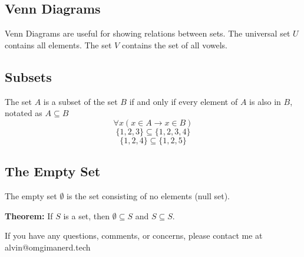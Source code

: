 \documentclass[letterpaper, 12pt]{math}
\begin{document}
\subsection*{Venn Diagrams}
Venn Diagrams are useful for showing relations between sets. The universal
set \( U \) contains all elements. The set \( V \) contains the set of all
vowels.
\begin{center}
\end{center}

\subsection*{Subsets}
The set \( A \) is a subset of the set \( B \) if and only if every element of
\( A \) is also in \( B \), notated as \( A \subseteq B \)
\[ \forall{x}(x \in A \to x \in B) \]
\[ \bigg\{1,2,3\bigg\} \subseteq \bigg\{1,2,3,4\bigg\} \]
\[ \bigg\{1,2,4\bigg\} \subseteq \bigg\{1,2,5\bigg\} \]

\subsection*{The Empty Set}
The empty set \( \emptyset \) is the set consisting of no elements (null set).
\par
\textbf{Theorem:} If \( S \) is a set, then \( \emptyset \subseteq S \) and
\( S \subseteq S \).

\begin{center}
  If you have any questions, comments, or concerns, please contact me at
  alvin@omgimanerd.tech
\end{center}
\end{document}
